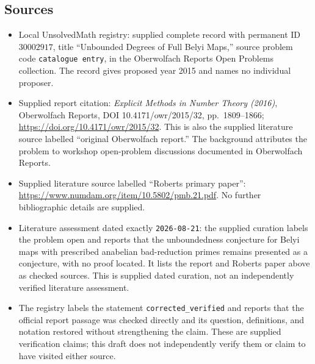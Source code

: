 \documentclass[11pt]{article}
\begin{document}
\subsection{Sources}
\begin{itemize}
\item Local UnsolvedMath registry: supplied complete record with permanent ID \(30002917\), title ``Unbounded Degrees of Full Belyi Maps,'' source problem code \texttt{catalogue entry}, in the Oberwolfach Reports Open Problems collection. The record gives proposed year 2015 and names no individual proposer.
\item Supplied report citation: \emph{Explicit Methods in Number Theory (2016)}, Oberwolfach Reports, DOI 10.4171/owr/2015/32, pp.\ 1809--1866; \url{https://doi.org/10.4171/owr/2015/32}. This is also the supplied literature source labelled ``original Oberwolfach report.'' The background attributes the problem to workshop open-problem discussions documented in Oberwolfach Reports.
\item Supplied literature source labelled ``Roberts primary paper'': \url{https://www.numdam.org/item/10.5802/pmb.21.pdf}. No further bibliographic details are supplied.
\item Literature assessment dated exactly \texttt{2026-08-21}: the supplied curation labels the problem open and reports that the unboundedness conjecture for Belyi maps with prescribed anabelian bad-reduction primes remains presented as a conjecture, with no proof located. It lists the report and Roberts paper above as checked sources. This is supplied dated curation, not an independently verified literature assessment.
\item The registry labels the statement \texttt{corrected\_verified} and reports that the official report passage was checked directly and its question, definitions, and notation restored without strengthening the claim. These are supplied verification claims; this draft does not independently verify them or claim to have visited either source.
\end{itemize}
\end{document}
